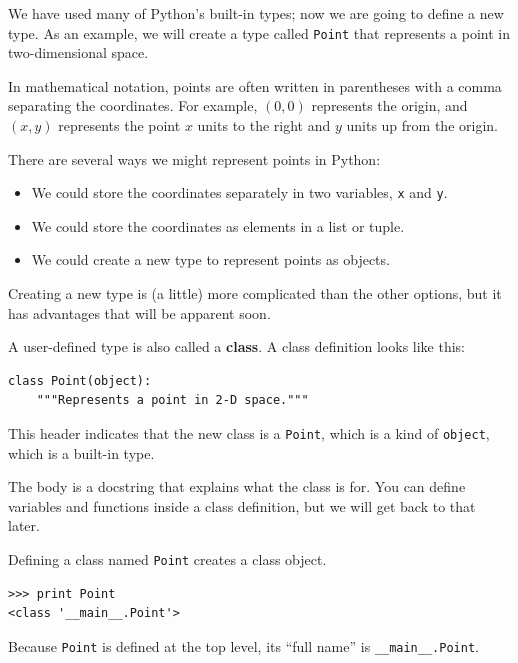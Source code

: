 \documentclass[12pt,a4paper,final,twoside,onecolumn,titlepage]{book}
\begin{document}
We have used many of Python's built-in types; now we are going
to define a new type.  As an example, we will create a type
called {\tt Point} that represents a point in two-dimensional
space.

In mathematical notation, points are often written in
parentheses with a comma separating the coordinates. For example,
$(0,0)$ represents the origin, and $(x,y)$ represents the
point $x$ units to the right and $y$ units up from the origin.

There are several ways we might represent points in Python:

\begin{itemize}

\item We could store the coordinates separately in two
variables, {\tt x} and {\tt y}.

\item We could store the coordinates as elements in a list
or tuple.

\item We could create a new type to represent points as
objects.

\end{itemize}

Creating a new type
is (a little) more complicated than the other options, but
it has advantages that will be apparent soon.

A user-defined type is also called a {\bf class}.
A class definition looks like this:

\begin{verbatim}
class Point(object):
    """Represents a point in 2-D space."""
\end{verbatim}
%
This header indicates that the new class is a {\tt Point},
which is a kind of {\tt object}, which is a built-in
type.

The body is a docstring that explains what the class is for.
You can define variables and functions inside a class definition,
but we will get back to that later.

Defining a class named {\tt Point} creates a class object.

\begin{verbatim}
>>> print Point
<class '__main__.Point'>
\end{verbatim}
%
Because {\tt Point} is defined at the top level, its ``full
name'' is \verb"__main__.Point".
\end{document}
